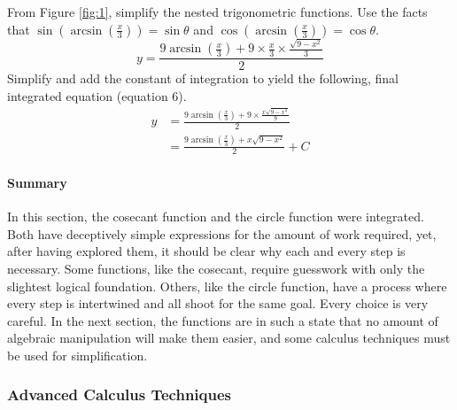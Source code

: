 \documentclass{article}
\begin{document}
From Figure \ref{fig:1}, simplify the nested trigonometric functions. Use the facts that $\sin\left(\arcsin\left(\frac{x}{3}\right)\right)=\sin\theta$ and $\cos\left(\arcsin\left(\frac{x}{3}\right)\right)=\cos\theta$.
\begin{equation*}
    y=\frac{9\arcsin\left(\frac{x}{3}\right)+9\times\frac{x}{3}\times\frac{\sqrt{9-x^2}}{3}}{2}
\end{equation*}
Simplify and add the constant of integration to yield the following, final integrated equation (equation 6).
\begin{align*}
    y &= \frac{9\arcsin\left(\frac{x}{3}\right)+9\times\frac{x\sqrt{9-x^2}}{9}}{2}\\
    &= \frac{9\arcsin\left(\frac{x}{3}\right)+x\sqrt{9-x^2}}{2}+C\tag{6}
\end{align*}
\newpage
\paragraph{Summary} In this section, the cosecant function and the circle function were integrated. Both have deceptively simple expressions for the amount of work required, yet, after having explored them, it should be clear why each and every step is necessary. Some functions, like the cosecant, require guesswork with only the slightest logical foundation. Others, like the circle function, have a process where every step is intertwined and all shoot for the same goal. Every choice is very careful. In the next section, the functions are in such a state that no amount of algebraic manipulation will make them easier, and some calculus techniques must be used for simplification.
\newpage

\subsubsection{Advanced Calculus Techniques}
\end{document}
